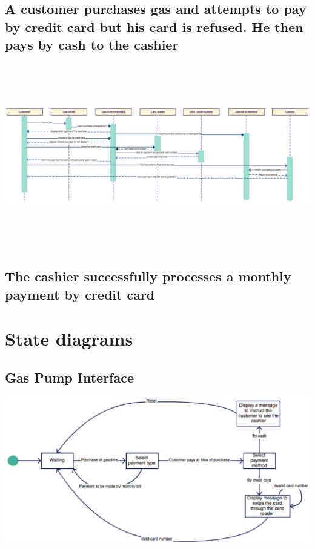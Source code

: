 \documentclass[11pt, a4paper]{article}
\begin{document}
\subsection{A customer purchases gas and attempts to pay by credit card but his card is refused. He then pays by cash to the cashier}

\begin{center}
\includegraphics[width=17cm, height=8cm, angle=90]{credicash.pdf}
\end{center}

\newpage

\subsection{The cashier successfully processes a monthly payment by credit card}



\newpage

\section{State diagrams}

\subsection{Gas Pump Interface}

\begin{center}
\includegraphics[width=\textwidth]{GasPumpInterface_diagram.pdf}
\end{center}
\end{document}
